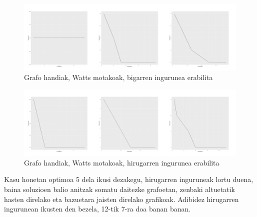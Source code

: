 \documentclass[eu,gi]{ifirak}\usepackage[]{graphicx}\usepackage[]{color}
\makeatletter
\def\maxwidth{ %
  \ifdim\Gin@nat@width>\linewidth
    \linewidth
  \else
    \Gin@nat@width
  \fi
}
\newenvironment{knitrout}{}{} %
\makeatother
\begin{document}
\begin{center}	
\begin{knitrout}
\color{fgcolor}\begin{figure}[!h]
\includegraphics[width=\maxwidth]{figure/unnamed-chunk-17-1} \caption[Grafo handiak, Watts motakoak, bigarren ingurunea erabilita]{Grafo handiak, Watts motakoak, bigarren ingurunea erabilita}\label{fig:unnamed-chunk-17}
\end{figure}


\end{knitrout}
\end{center}

\begin{center}	
\begin{knitrout}
\color{fgcolor}\begin{figure}[!h]
\includegraphics[width=\maxwidth]{figure/unnamed-chunk-18-1} \caption[Grafo handiak, Watts motakoak, hirugarren ingurunea erabilita]{Grafo handiak, Watts motakoak, hirugarren ingurunea erabilita}\label{fig:unnamed-chunk-18}
\end{figure}


\end{knitrout}
\end{center}

Kasu honetan optimoa 5 dela ikusi dezakegu, hirugarren inguruneak lortu duena, baina soluzioen balio anitzak somatu daitezke grafoetan, zenbaki altuetatik hasten direlako eta bazuetara jaisten direlako grafikoak. Adibidez hirugarren ingurunean ikusten den bezela, 12-tik 7-ra doa banan banan.\\
\end{document}
